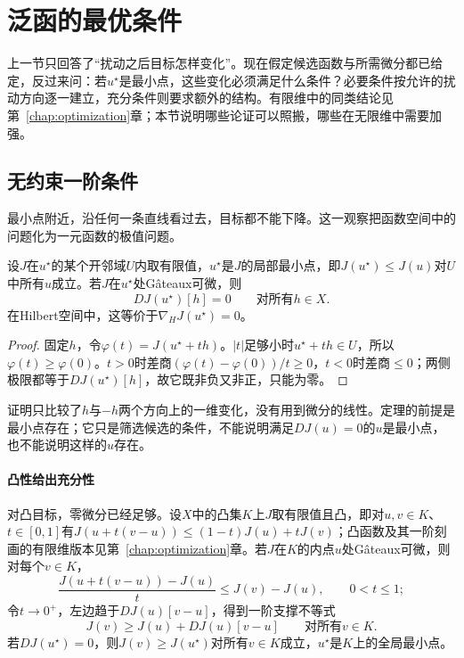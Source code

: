 
\section{泛函的最优条件}
\label{sec:opt-fn-optimality}

上一节只回答了“扰动之后目标怎样变化”。现在假定候选函数与所需微分都已给定，反过来问：若$u^\star$是最小点，这些变化必须满足什么条件？必要条件按允许的扰动方向逐一建立，充分条件则要求额外的结构。有限维中的同类结论见第~\ref{chap:optimization}章；本节说明哪些论证可以照搬，哪些在无限维中需要加强。

\subsection{无约束一阶条件}
\label{sec:opt-fn-unconstrained-first}

最小点附近，沿任何一条直线看过去，目标都不能下降。这一观察把函数空间中的问题化为一元函数的极值问题。

\begin{theorem}[一阶必要条件]
\label{thm:opt-fn-first-order-necessary}
设$J$在$u^\star$的某个开邻域$U$内取有限值，$u^\star$是$J$的局部最小点，即$J(u^\star)\le J(u)$对$U$中所有$u$成立。若$J$在$u^\star$处Gâteaux可微，则
\[
 DJ(u^\star)[h]=0\qquad\text{对所有}h\in X .
\]
在Hilbert空间中，这等价于$\nabla_HJ(u^\star)=0$。
\end{theorem}

\begin{proof}
固定$h$，令$\varphi(t)=J(u^\star+th)$。$|t|$足够小时$u^\star+th\in U$，所以$\varphi(t)\ge\varphi(0)$。$t>0$时差商$(\varphi(t)-\varphi(0))/t\ge0$，$t<0$时差商$\le0$；两侧极限都等于$DJ(u^\star)[h]$，故它既非负又非正，只能为零。
\end{proof}

证明只比较了$h$与$-h$两个方向上的一维变化，没有用到微分的线性。定理的前提是最小点存在；它只是筛选候选的条件，不能说明满足$DJ(u)=0$的$u$是最小点，也不能说明这样的$u$存在。

\paragraph{凸性给出充分性}
对凸目标，零微分已经足够。设$X$中的凸集$K$上$J$取有限值且凸，即对$u,v\in K$、$t\in[0,1]$有$J(u+t(v-u))\le(1-t)J(u)+tJ(v)$；凸函数及其一阶刻画的有限维版本见第~\ref{chap:optimization}章。若$J$在$K$的内点$u$处Gâteaux可微，则对每个$v\in K$，
\[
 \frac{J(u+t(v-u))-J(u)}t\le J(v)-J(u),\qquad0<t\le1 ;
\]
令$t\to0^+$，左边趋于$DJ(u)[v-u]$，得到一阶支撑不等式
\begin{equation}
 J(v)\ge J(u)+DJ(u)[v-u]\qquad\text{对所有}v\in K .
 \label{eq:opt-fn-convex-support}
\end{equation}
若$DJ(u^\star)=0$，则$J(v)\ge J(u^\star)$对所有$v\in K$成立，$u^\star$是$K$上的全局最小点。

